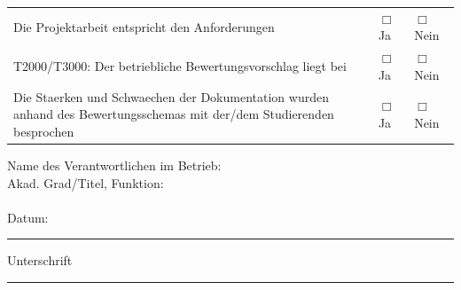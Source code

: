 	\begin{center}
		\begin{tabular}{|p{9cm} p{2.5cm} p{2.5cm}|}
		\hline
		Die Projektarbeit entspricht den Anforderungen & $\Box$ Ja & $\Box$ Nein \\
		T2000/T3000: Der betriebliche Bewertungsvorschlag liegt bei & $\Box$ Ja & $\Box$ Nein \\
		Die Staerken und Schwaechen der Dokumentation wurden anhand des Bewertungsschemas mit der/dem Studierenden besprochen & $\Box$ Ja & $\Box$ Nein \\
		\hline
		\end{tabular}
	\end{center}

Name des Verantwortlichen im Betrieb: \ausbildungsleitung\\
Akad. Grad/Titel, Funktion: \ausbildungsleitungt\\
	\vspace*{2mm}\\
Datum: \rule{4cm}{0.4pt}\hspace*{5mm} Unterschrift \rule{4cm}{0.4pt}\\